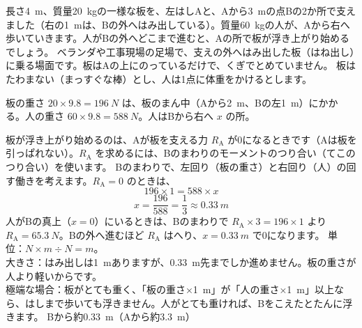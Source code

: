 \begin{phreidai}
\label{ph:力-10:ex4}長さ\qty{4}{m}、質量\qty{20}{kg}の一様な板を、左はしAと、Aから\qty{3}{m}の点Bの2か所で支えました（右の\qty{1}{m}は、Bの外へはみ出している）。質量\qty{60}{kg}の人が、Aから右へ歩いていきます。人がBの外へどこまで進むと、Aの所で板が浮き上がり始めるでしょう。
\phbamen
ベランダや工事現場の足場で、支えの外へはみ出した板（はね出し）に乗る場面です。板はAの上にのっているだけで、くぎでとめていません。
\phmushi
板はたわまない（まっすぐな棒）とし、人は1点に体重をかけるとします。
\phzu
\par\vspace{3pt}\noindent\begin{minipage}[c]{0.52\linewidth}
\end{minipage}\hfill
\begin{minipage}[c]{0.44\linewidth}
板の重さ $20\times9.8=\qty{196}{N}$ は、板のまん中（Aから\qty{2}{m}、Bの左\qty{1}{m}）にかかる。人の重さ $60\times9.8=\qty{588}{N}$。人はBから右へ $x$ の所。
\end{minipage}
\phriyu
板が浮き上がり始めるのは、Aが板を支える力 $R_{\mathrm A}$ が0になるときです（Aは板を引っぱれない）。$R_{\mathrm A}$ を求めるには、Bのまわりのモーメントのつり合い（てこのつり合い）を使います。
\phtateru
Bのまわりで、左回り（板の重さ）と右回り（人）の回す働きを考えます。$R_{\mathrm A}=0$ のときは、
\[ 196\times1=588\times x \]
\phtoku
\[ x=\frac{196}{588}=\frac{1}{3}\approx\qty{0.33}{m} \]
人がBの真上（$x=0$）にいるときは、Bのまわりで $R_{\mathrm A}\times3=196\times1$ より $R_{\mathrm A}=\qty{65.3}{N}$。Bの外へ進むほど $R_{\mathrm A}$ はへり、$x=\qty{0.33}{m}$ で0になります。
\phtashikame
単位：$\unit{N}\times\unit{m}\div\unit{N}=\unit{m}$。\\
大きさ：はみ出しは\qty{1}{m}ありますが、\qty{0.33}{m}先までしか進めません。板の重さが人より軽いからです。\\
極端な場合：板がとても重く、「板の重さ×\qty{1}{m}」が「人の重さ×\qty{1}{m}」以上なら、はしまで歩いても浮きません。人がとても重ければ、Bをこえたとたんに浮きます。
\kotae Bから約\qty{0.33}{m}（Aから約\qty{3.3}{m}）
\end{phreidai}

